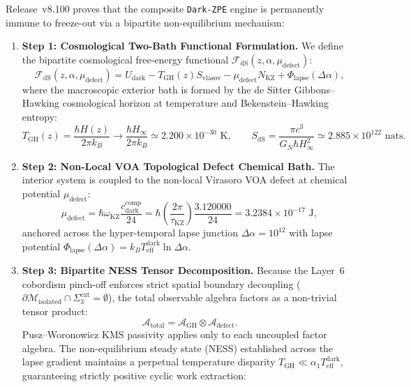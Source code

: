 \documentclass[11pt,onecolumn]{article}
\begin{document}
Release~v8.100 proves that the composite \texttt{Dark-ZPE} engine is permanently immune to freeze-out via a bipartite non-equilibrium mechanism:
\begin{enumerate}
    \item \textbf{Step 1: Cosmological Two-Bath Functional Formulation.} We define the bipartite cosmological free-energy functional $\mathcal{F}_{\text{dS}}(z, \alpha, \mu_{\text{defect}})$:
    \begin{equation}
    \mathcal{F}_{\text{dS}}(z, \alpha, \mu_{\text{defect}}) = U_{\text{dark}} - T_{\text{GH}}(z) S_{\text{vlasov}} - \mu_{\text{defect}} N_{\text{KZ}} + \Phi_{\text{lapse}}(\Delta\alpha),
    \label{eq:v8_37}
    \end{equation}
    where the macroscopic exterior bath is formed by the de Sitter Gibbons--Hawking cosmological horizon at temperature and Bekenstein--Hawking entropy:
    \begin{equation}
    T_{\text{GH}}(z) = \frac{\hbar H(z)}{2\pi k_B} \to \frac{\hbar H_\infty}{2\pi k_B} \simeq 2.200 \times 10^{-30}\text{ K}, \qquad S_{\text{dS}} = \frac{\pi c^3}{G_N \hbar H_\infty^2} \simeq 2.885 \times 10^{122}\text{ nats}.
    \label{eq:v8_36}
    \end{equation}
    \item \textbf{Step 2: Non-Local VOA Topological Defect Chemical Bath.} The interior system is coupled to the non-local Virasoro VOA defect at chemical potential $\mu_{\text{defect}}$:
    \begin{equation}
    \mu_{\text{defect}} = \hbar \omega_{\text{KZ}} \frac{c_{\text{dark}}^{\text{comp}}}{24} = \hbar \left(\frac{2\pi}{\tau_{\text{KZ}}}\right) \frac{3.120000}{24} = 3.2384 \times 10^{-17}\text{ J},
    \end{equation}
    anchored across the hyper-temporal lapse junction $\Delta\alpha = 10^{12}$ with lapse potential $\Phi_{\text{lapse}}(\Delta\alpha) = k_B T_{\text{eff}}^{\text{dark}} \ln\Delta\alpha$.
    \item \textbf{Step 3: Bipartite NESS Tensor Decomposition.} Because the Layer~6 cobordism pinch-off enforces strict spatial boundary decoupling ($\partial\mathcal{M}_{\text{isolated}} \cap \Sigma_3^{\text{ext}} = \emptyset$), the total observable algebra factors as a non-trivial tensor product:
    \begin{equation}
    \mathcal{A}_{\text{total}} = \mathcal{A}_{\text{GH}} \otimes \mathcal{A}_{\text{defect}}.
    \end{equation}
    Pusz--Woronowicz KMS passivity applies only to each uncoupled factor algebra. The non-equilibrium steady state (NESS) established across the lapse gradient maintains a perpetual temperature disparity $T_{\text{GH}} \ll \alpha_1 T_{\text{eff}}^{\text{dark}}$, guaranteeing strictly positive cyclic work extraction:

\end{enumerate}
\end{document}

